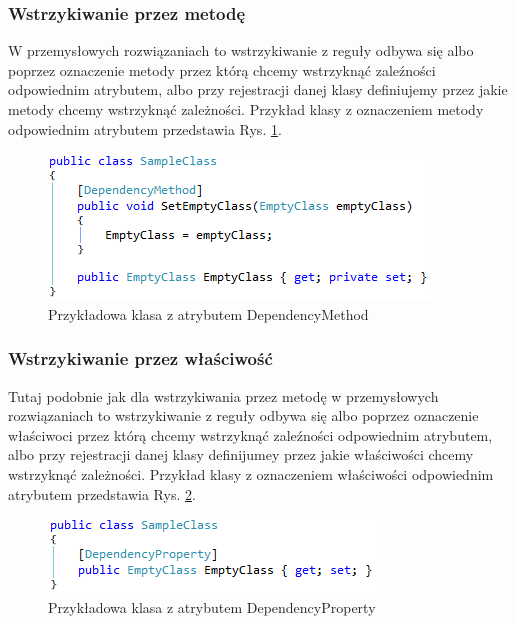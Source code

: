 \documentclass[12pt]{article}
\begin{document}
\subsubsection{Wstrzykiwanie przez metodę}
W przemysłowych rozwiązaniach to wstrzykiwanie z reguły odbywa się albo poprzez oznaczenie metody przez którą chcemy wstrzyknąć zaleźności odpowiednim atrybutem, albo przy rejestracji danej klasy definiujemy przez jakie metody chcemy wstrzyknąć zależności. Przykład klasy z oznaczeniem metody odpowiednim atrybutem przedstawia Rys. \ref{fig:DependencyMethod}.\\
\begin{figure}[H]
	\begin{center}
  		\includegraphics{DependencyMethod.png}
  		\caption{Przykładowa klasa z atrybutem DependencyMethod}
  		\label{fig:DependencyMethod}
	\end{center}
\end{figure}

\subsubsection{Wstrzykiwanie przez właściwość}
Tutaj podobnie jak dla wstrzykiwania przez metodę w przemysłowych rozwiązaniach to wstrzykiwanie z reguły odbywa się albo poprzez oznaczenie właściwoci przez którą chcemy wstrzyknąć zaleźności odpowiednim atrybutem, albo przy rejestracji danej klasy definijumey przez jakie właściwości chcemy wstrzyknąć zależności. Przykład klasy z oznaczeniem właściwości odpowiednim atrybutem przedstawia Rys. \ref{fig:DependencyProperty}.\\
\begin{figure}[H]
	\begin{center}
  		\includegraphics{DependencyProperty.png}
  		\caption{Przykładowa klasa z atrybutem DependencyProperty}
  		\label{fig:DependencyProperty}
	\end{center}
\end{figure}
\end{document}
